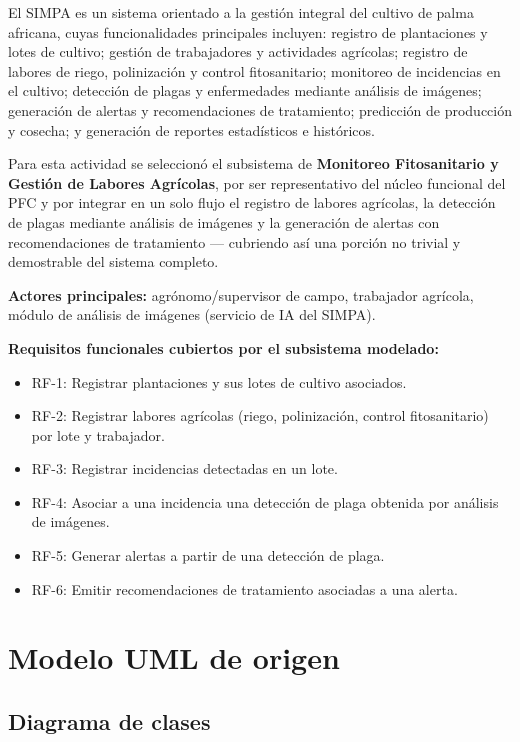 \documentclass[11pt,a4paper]{article}
\begin{document}
	El SIMPA es un sistema orientado a la gestión integral del cultivo de palma africana, cuyas funcionalidades principales incluyen: registro de plantaciones y lotes de cultivo; gestión de trabajadores y actividades agrícolas; registro de labores de riego, polinización y control fitosanitario; monitoreo de incidencias en el cultivo; detección de plagas y enfermedades mediante análisis de imágenes; generación de alertas y recomendaciones de tratamiento; predicción de producción y cosecha; y generación de reportes estadísticos e históricos.
	
	Para esta actividad se seleccionó el subsistema de \textbf{Monitoreo Fitosanitario y Gestión de Labores Agrícolas}, por ser representativo del núcleo funcional del PFC y por integrar en un solo flujo el registro de labores agrícolas, la detección de plagas mediante análisis de imágenes y la generación de alertas con recomendaciones de tratamiento — cubriendo así una porción no trivial y demostrable del sistema completo.
	
	\textbf{Actores principales:} agrónomo/supervisor de campo, trabajador agrícola, módulo de análisis de imágenes (servicio de IA del SIMPA).
	
	\textbf{Requisitos funcionales cubiertos por el subsistema modelado:}
	\begin{itemize}[nosep]
		\item RF-1: Registrar plantaciones y sus lotes de cultivo asociados.
		\item RF-2: Registrar labores agrícolas (riego, polinización, control fitosanitario) por lote y trabajador.
		\item RF-3: Registrar incidencias detectadas en un lote.
		\item RF-4: Asociar a una incidencia una detección de plaga obtenida por análisis de imágenes.
		\item RF-5: Generar alertas a partir de una detección de plaga.
		\item RF-6: Emitir recomendaciones de tratamiento asociadas a una alerta.
	\end{itemize}
	
	\section{Modelo UML de origen}
	\label{sec:modelo}
	
	\subsection{Diagrama de clases}
	
\end{document}
